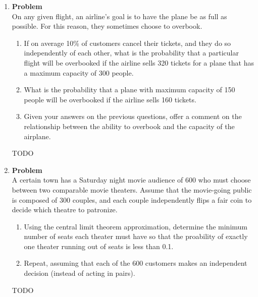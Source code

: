 \documentclass[12pt]{article}
\newenvironment{Ex}{\textbf{Problem}\vspace{.75em}\\}{}
\begin{document}
\begin{enumerate}
\item
  \begin{Ex}
    On any given flight, an airline’s goal is to have the plane be as
    full as possible. For this reason, they sometimes choose to
    overbook.
    \begin{enumerate}
    \item If on average 10\% of customers cancel their tickets, and
      they do so independently of each other, what is the probability
      that a particular flight will be overbooked if the airline sells
      320 tickets for a plane that has a maximum capacity of 300
      people.
    \item What is the probability that a plane with maximum capacity
      of 150 people will be overbooked if the airline sells 160
      tickets.
    \item Given your answers on the previous questions, offer a
      comment on the relationship between the ability to overbook and
      the capacity of the airplane.
    \end{enumerate}
    \begin{solution} \hfill
      {\color{red} \huge TODO}
    \end{solution}
  \end{Ex}

\item
  \begin{Ex}
    A certain town has a Saturday night movie audience of 600 who must
    choose between two comparable movie theaters. Assume that the
    movie-going public is composed of 300 couples, and each couple
    independently flips a fair coin to decide which theatre to
    patronize.
    \begin{enumerate}
    \item Using the central limit theorem approximation, determine the
      minimum number of seats each theater must have so that the
      proability of exactly one theater running out of seats is less
      than 0.1.
    \item Repeat, assuming that each of the 600 customers makes an
      independent decision (instead of acting in pairs).
    \end{enumerate}
    \begin{solution} \hfill
      {\color{red} \huge TODO}
    \end{solution}
  \end{Ex}


\end{enumerate}
\end{document}
